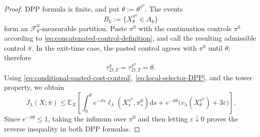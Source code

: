 \documentclass[11pt]{article}
\def\E{\mathbb{E}}
\def\Fc{{\mathcal F}}
\newcommand{\dd}{\mathrm{d}}
\theoremstyle{definition}
\theoremstyle{remark}
\numberwithin{equation}{section}
\begin{document}
\begin{proof}
DPP formula is finite, and put $\theta:=\theta^{\pi^0}$.  The events
\[
 B_k:=\{X_\theta^{\pi^0}\in A_k\}
\]
form an $\Fc_\theta^0$-measurable partition.  Paste $\pi^0$ with the continuation controls
$\pi^k$ according to \eqref{eq:concatenated-control-definition}, and call the resulting admissible
control $\bar\pi$.  In the exit-time case, the pasted control agrees with $\pi^0$ until $\theta$;
therefore
\[
 \tau_{D,T}^{\bar\pi}=\tau_{D,T}^{\pi^0}=\theta.
\]
Using \eqref{eq:conditional-pasted-cost-control}, \eqref{eq:local-selector-DPP}, and the tower
property, we obtain
\[
 J_\lambda(X;\bar\pi)
 \le\E_X\left[
 \int_0^\theta e^{-\vartheta s}
 \ell_\lambda(X_s^{\pi^0},\pi_s^0)\dd s
 +e^{-\vartheta\theta}
 \bigl(v_\lambda(X_\theta^{\pi^0})+3\varepsilon\bigr)
 \right].
\]
Since $e^{-\vartheta\theta}\le1$, taking the infimum over $\pi^0$ and then letting
$\varepsilon\downarrow0$ proves the reverse inequality in both DPP formulas.
\end{proof}
\end{document}
